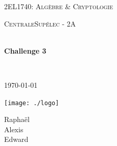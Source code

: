 \begin{titlepage}
\begin{center}


\LARGE \textsc{2EL1740: Algèbre \& Cryptologie}

\vspace{0.2cm}

\Large \textsc{CentraleSupélec - 2A}

\vspace{0.3cm}

\HRule \\[0.4cm]

{\huge \bfseries Challenge 3\\
[0.2cm]}

\HRule \\[0.4cm]

\vspace{2cm}

\textsc{\today}

\vspace{2cm}

\texttt{[image: ./logo]}~\\[3cm]

\begin{minipage}{0.4\textwidth}
\begin{spacing}{1.125}
\begin{center}
    Raphaël \\
    Alexis \\
    Edward 
\end{center}
\end{spacing}
\end{minipage}

\vfill

\end{center}
\end{titlepage}